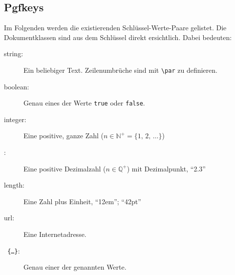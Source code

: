 		\subsection{Pgfkeys}
			Im Folgenden werden die existierenden Schlüssel-Werte-Paare gelistet. Die Dokumentklassen sind aus dem Schlüssel direkt ersichtlich. Dabei bedeuten:
			\begin{description}
				\item[string:]
						Ein beliebiger Text. Zeilenumbrüche sind mit \verb|\par| zu definieren.
				\item[boolean:]
						Genau eines der Werte \texttt{true} oder \texttt{false}.
				\item[integer:]
						Eine positive, ganze Zahl ($n \in \mathbb N^+ = \{1, \, 2, \, \ldots\}$)
				\item[\doubleplus:]
						Eine positive Dezimalzahl ($n \in \mathbb Q^+$) mit Dezimalpunkt, \zb "`2.3"'
				\item[length:]
						Eine Zahl plus Einheit, \zb "`12em"'; "`42pt"'
				\item[url:]
						Eine Internetadresse.
				\item[{\texttt{ \{\ldots\}}}:]
						Genau einer der genannten Werte.
			\end{description}
			\enlargethispage*{2em}
